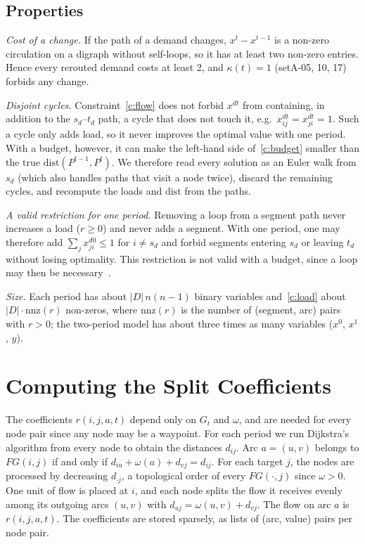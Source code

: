 \documentclass[conference]{IEEEtran}
\begin{document}
\subsection{Properties}\label{sec:props}
\emph{Cost of a change.} If the path of a demand changes, $x^t-x^{t-1}$ is a non-zero circulation on a digraph without self-loops, so it has at least two non-zero entries. Hence every rerouted demand costs at least 2, and $\kappa(t)=1$ (setA-05, 10, 17) forbids any change.

\emph{Disjoint cycles.} Constraint~\eqref{c:flow} does not forbid $x^{dt}$ from containing, in addition to the $s_d$--$t_d$ path, a cycle that does not touch it, e.g.\ $x^{dt}_{ij}=x^{dt}_{ji}=1$. Such a cycle only adds load, so it never improves the optimal value with one period. With a budget, however, it can make the left-hand side of~\eqref{c:budget} smaller than the true $\mathrm{dist}(P^{t-1},P^t)$. We therefore read every solution as an Euler walk from $s_d$ (which also handles paths that visit a node twice), discard the remaining cycles, and recompute the loads and $\mathrm{dist}$ from the paths.

\emph{A valid restriction for one period.} Removing a loop from a segment path never increases a load ($r\ge0$) and never adds a segment. With one period, one may therefore add $\sum_j x^{d0}_{ji}\le1$ for $i\neq s_d$ and forbid segments entering $s_d$ or leaving $t_d$ without losing optimality. This restriction is not valid with a budget, since a loop may then be necessary~\cite{benhamiche2026}.

\emph{Size.} Each period has about $|D|\,n(n-1)$ binary variables and~\eqref{c:load} about $|D|\cdot\mathrm{nnz}(r)$ non-zeros, where $\mathrm{nnz}(r)$ is the number of (segment, arc) pairs with $r>0$; the two-period model has about three times as many variables ($x^0$, $x^1$, $y$).

\section{Computing the Split Coefficients}\label{sec:r}

The coefficients $r(i,j,a,t)$ depend only on $G_t$ and $\omega$, and are needed for every node pair since any node may be a waypoint. For each period we run Dijkstra's algorithm from every node to obtain the distances $d_{ij}$. Arc $a=(u,v)$ belongs to $FG(i,j)$ if and only if $d_{iu}+\omega(a)+d_{vj}=d_{ij}$. For each target $j$, the nodes are processed by decreasing $d_{\cdot j}$, a topological order of every $FG(\cdot,j)$ since $\omega>0$. One unit of flow is placed at $i$, and each node splits the flow it receives evenly among its outgoing arcs $(u,v)$ with $d_{uj}=\omega(u,v)+d_{vj}$. The flow on arc $a$ is $r(i,j,a,t)$. The coefficients are stored sparsely, as lists of (arc, value) pairs per node pair.
\end{document}

